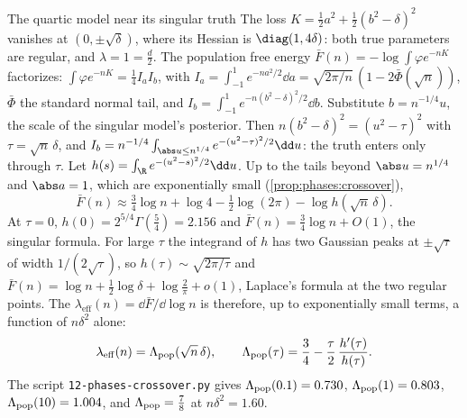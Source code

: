 \begin{refsection}
\begin{computation}{The quartic model near its singular truth}\label{comp:phases:quartic}
\step The loss $K=\frac12a^2+\frac12(b^2-\delta)^2$ vanishes at $(0,\pm\sqrt\delta)$, where its Hessian is $\diag(1,4\delta)$: both true parameters are regular, and $\lambda=1=\frac d2$.
\step The population free energy $\bar F(n)=-\log\int\varphi e^{-nK}$ factorizes: $\int\varphi e^{-nK}=\frac14I_aI_b$, with $I_a=\int_{-1}^1e^{-na^2/2}\dd a=\sqrt{2\pi/n}\,(1-2\bar\Phi(\sqrt n))$, $\bar\Phi$ the standard normal tail, and $I_b=\int_{-1}^1e^{-n(b^2-\delta)^2/2}\dd b$.
\step Substitute $b=n^{-1/4}u$, the scale of the singular model's posterior. Then $n(b^2-\delta)^2=(u^2-\tau)^2$ with $\tau=\sqrt n\,\delta$, and $I_b=n^{-1/4}\int_{\abs u\le n^{1/4}}e^{-(u^2-\tau)^2/2}\dd u$: the truth enters only through $\tau$.
\step Let $h(s)=\int_\R e^{-(u^2-s)^2/2}\dd u$. Up to the tails beyond $\abs u=n^{1/4}$ and $\abs a=1$, which are exponentially small (\cref{prop:phases:crossover}),
\[
\bar F(n)\approx\tfrac34\log n+\log4-\tfrac12\log(2\pi)-\log h(\sqrt n\,\delta).
\]
\step At $\tau=0$, $h(0)=2^{5/4}\Gamma(\frac54)=2.156$ and $\bar F(n)=\frac34\log n+O(1)$, the singular formula. For large $\tau$ the integrand of $h$ has two Gaussian peaks at $\pm\sqrt\tau$ of width $1/(2\sqrt\tau)$, so $h(\tau)\sim\sqrt{2\pi/\tau}$ and $\bar F(n)=\log n+\frac12\log\delta+\log\frac2\pi+o(1)$, Laplace's formula at the two regular points.
\step The  $\lambda_{\mathrm{eff}}(n)=\dd\bar F/\dd\log n$ is therefore, up to exponentially small terms, a function of $n\delta^2$ alone:
\[
\lambda_{\mathrm{eff}}(n)=\Lambda_{\mathrm{pop}}(\sqrt n\,\delta),\qquad\Lambda_{\mathrm{pop}}(\tau)=\frac34-\frac\tau2\,\frac{h'(\tau)}{h(\tau)} .
\]
The script \texttt{12-phases-crossover.py} gives $\Lambda_{\mathrm{pop}}(0.1)=0.730$, $\Lambda_{\mathrm{pop}}(1)=0.803$, $\Lambda_{\mathrm{pop}}(10)=1.004$, and $\Lambda_{\mathrm{pop}}=\frac78$ at $n\delta^2=1.60$.
\end{computation}


\end{refsection}
